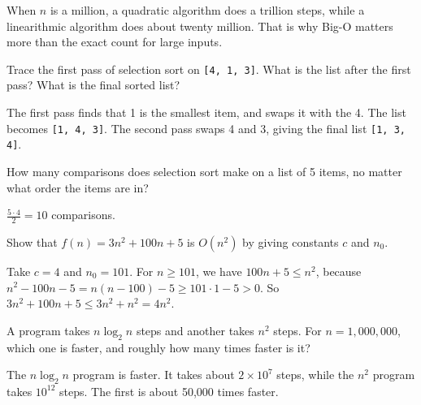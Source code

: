 When $n$ is a million, a quadratic algorithm does a trillion steps, while a
linearithmic algorithm does about twenty million. That is why Big-O matters
more than the exact count for large inputs.

\begin{Exercise}[label=sorting1, title=Trace selection sort]
Trace the first pass of selection sort on \texttt{[4, 1, 3]}. What is the list
after the first pass? What is the final sorted list?
\end{Exercise}
\begin{Answer}[ref=sorting1]
The first pass finds that 1 is the smallest item, and swaps it with the 4. The
list becomes \texttt{[1, 4, 3]}. The second pass swaps 4 and 3, giving the
final list \texttt{[1, 3, 4]}.
\end{Answer}

\begin{Exercise}[label=sorting2, title=Count the comparisons]
How many comparisons does selection sort make on a list of 5 items, no matter
what order the items are in?
\end{Exercise}
\begin{Answer}[ref=sorting2]
$\frac{5 \cdot 4}{2} = 10$ comparisons.
\end{Answer}

\begin{Exercise}[label=sorting3, title=Prove a Big-O bound]
Show that $f(n) = 3n^2 + 100n + 5$ is $O(n^2)$ by giving constants $c$ and
$n_0$.
\end{Exercise}
\begin{Answer}[ref=sorting3]
Take $c = 4$ and $n_0 = 101$. For $n \geq 101$, we have $100n + 5 \leq n^2$,
because $n^2 - 100n - 5 = n(n - 100) - 5 \geq 101 \cdot 1 - 5 > 0$. So
$3n^2 + 100n + 5 \leq 3n^2 + n^2 = 4n^2$.
\end{Answer}

\begin{Exercise}[label=sorting4, title=Which is faster?]
A program takes $n \log_2 n$ steps and another takes $n^2$ steps. For
$n = 1{,}000{,}000$, which one is faster, and roughly how many times faster is
it?
\end{Exercise}
\begin{Answer}[ref=sorting4]
The $n \log_2 n$ program is faster. It takes about $2 \times 10^7$ steps, while
the $n^2$ program takes $10^{12}$ steps. The first is about 50,000 times faster.
\end{Answer}

